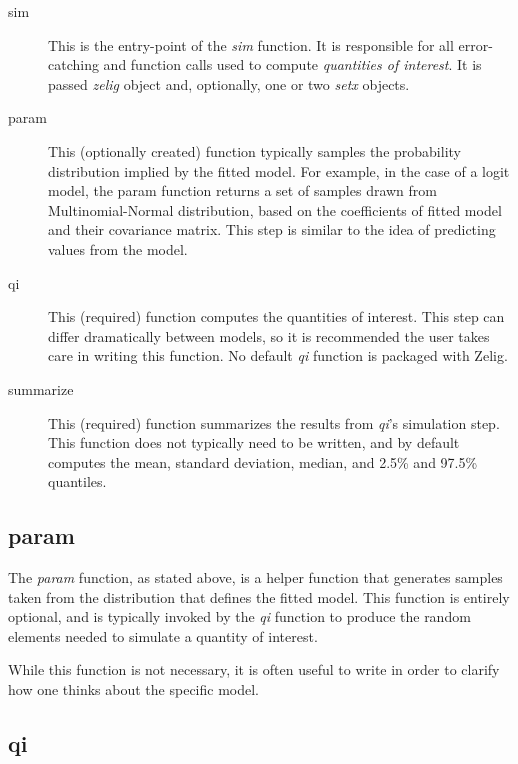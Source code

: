 \documentclass[a4paper, 11pt]{article}
\begin{document}
\begin{description}

	\item[sim]{This is the entry-point of the \emph{sim} function.  It is responsible for all error-catching and function calls used to compute \emph{quantities of interest}.  It is passed \emph{zelig} object and, optionally, one or two \emph{setx} objects.}

	\item[param]{This (optionally created) function typically samples the probability distribution implied by the fitted model.  For example, in the case of a logit model, the param function returns a set of samples drawn from Multinomial-Normal distribution, based on the coefficients of fitted model and their covariance matrix.  This step is similar to the idea of predicting values from the model.}
	
	\item[qi]{This (required) function computes the quantities of interest.  This step can differ dramatically between models, so it is recommended the user takes care in writing this function.  No default \emph{qi} function is packaged with Zelig.}
	
	\item[summarize]{This (required) function summarizes the results from \emph{qi}'s simulation step.  This function does not typically need to be written, and by default computes the mean, standard deviation, median, and 2.5\% and 97.5\% quantiles.}
	
\end{description}

\subsection{param}

The \emph{param} function, as stated above, is a helper function that generates samples taken from the distribution that defines the fitted model.  This function is entirely optional, and is typically invoked by the \emph{qi} function to produce the random elements needed to simulate a quantity of interest.

While this function is not necessary, it is often useful to write in order to clarify how one thinks about the specific model.

\subsection{qi}
\end{document}
